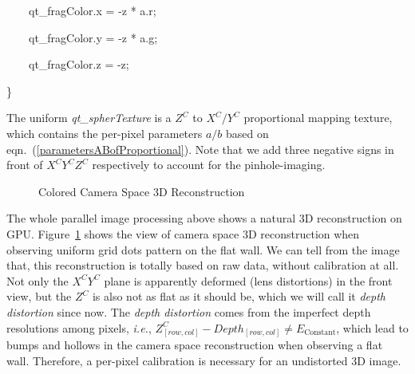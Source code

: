 \bigskip

{\ttfamily
\textcolor[rgb]{0.7529412,0.7529412,0.7529412}{\ \ \ \ }qt\_fragColor.x\textcolor[rgb]{0.7529412,0.7529412,0.7529412}{
} = \textcolor[rgb]{0.7529412,0.7529412,0.7529412}{
}{}-z\textcolor[rgb]{0.7529412,0.7529412,0.7529412}{
}*\textcolor[rgb]{0.7529412,0.7529412,0.7529412}{ }a.r;}

{\ttfamily
\textcolor[rgb]{0.7529412,0.7529412,0.7529412}{\ \ \ \ }qt\_fragColor.y\textcolor[rgb]{0.7529412,0.7529412,0.7529412}{
} = \textcolor[rgb]{0.7529412,0.7529412,0.7529412}{
}{}-z\textcolor[rgb]{0.7529412,0.7529412,0.7529412}{
}*\textcolor[rgb]{0.7529412,0.7529412,0.7529412}{ }a.g;}

{\ttfamily
\textcolor[rgb]{0.7529412,0.7529412,0.7529412}{\ \ \ \ }qt\_fragColor.z\textcolor[rgb]{0.7529412,0.7529412,0.7529412}{
} = \textcolor[rgb]{0.7529412,0.7529412,0.7529412}{ }{}-z;}

{\ttfamily
\}}

%
The uniform \emph{qt\_spherTexture} is a \(Z^C\) to \(X^C/Y^C\) proportional mapping texture, which contains the per-pixel parameters \(a/b\) based on eqn.~(\ref{parametersABofProportional}). Note that we add three negative signs in front of \(X^CY^CZ^C\) respectively to account for the pinhole-imaging. %
%
\begin{figure}[t]
\centering
{}
\caption{Colored Camera Space 3D Reconstruction}
\label{reconstructionInCameraSpace}
\end{figure}%
%
The whole parallel image processing above shows a natural 3D reconstruction on GPU. Figure~\ref{reconstructionInCameraSpace} shows the view of camera space 3D reconstruction when observing uniform grid dots pattern on the flat wall. We can tell from the image that, this reconstruction is totally based on raw data, without calibration at all. Not only the \(X^CY^C\) plane is apparently deformed (lens distortions) in the front view, but the \(Z^C\) is also not as flat as it should be, which we will call it \emph{depth distortion} since now. The \emph{depth distortion} comes from the imperfect depth resolutions among pixels, \textit{i.e.}, \(Z^C_{[row, col]} - Depth_{[row, col]} \neq E_{\text{Constant}}\), which lead to bumps and hollows in the camera space reconstruction when observing a flat wall. Therefore, a per-pixel calibration is necessary for an undistorted 3D image.

